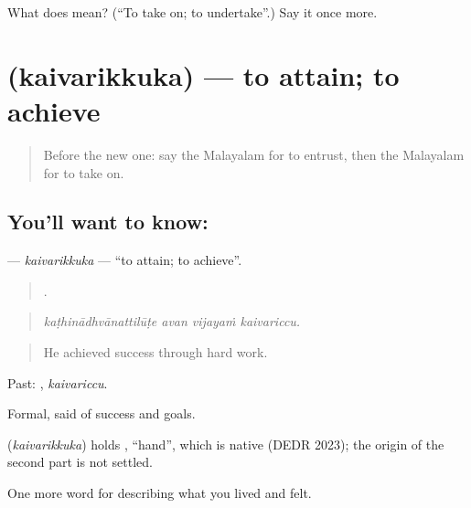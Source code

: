 \begin{tcolorbox}[breakable,colback=teal!4,colframe=teal!35!black,title={Before you move on}]
What does  mean? (\textquotedblleft{}To take on; to undertake\textquotedblright{}.) Say it once more.
\end{tcolorbox}
\section[\texorpdfstring{\ml{കൈവരിക്കുക} (kaivarikkuka)}{കൈവരിക്കുക (kaivarikkuka)}]{ (kaivarikkuka) — to attain; to achieve}

\label{lesson:ML-C551-kaivarikkuka}



\begin{quote}
Before the new one: say the Malayalam for to entrust, then the Malayalam for to take on.
\end{quote}

\subsection*{You'll want to know: }
\textbf{} — \emph{kaivarikkuka} — \textquotedblleft{}to attain; to achieve\textquotedblright{}.

\begin{quote}
   .
\end{quote}

\begin{quote}
\emph{kaṭhinādhvānattilūṭe avan vijayaṁ kaivariccu.}
\end{quote}

\begin{quote}
He achieved success through hard work.
\end{quote}

Past: , \emph{kaivariccu}.

Formal, said of success and goals.

\begin{cousinweb}
\textbf{} (\emph{kaivarikkuka}) holds , \textquotedblleft{}hand\textquotedblright{}, which is native (DEDR 2023); the origin of the second part is not settled.
\end{cousinweb}

\begin{grammarlens}[title={What you've built}]
One more word for describing what you lived and felt.
\end{grammarlens}

